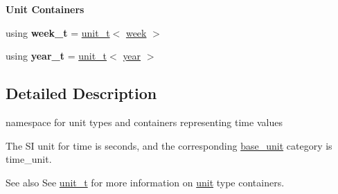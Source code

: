 \begin{Indent}{\bf Unit Containers}
\begin{DoxyCompactItemize}
\item 
\hypertarget{namespaceunits_1_1time_acae409f996805c6735385fbfaad53071}{}using {\bfseries week\+\_\+t} = \hyperlink{classunits_1_1unit__t}{unit\+\_\+t}$<$ \hyperlink{structunits_1_1unit}{week} $>$\label{namespaceunits_1_1time_acae409f996805c6735385fbfaad53071}

\item 
\hypertarget{namespaceunits_1_1time_a6dafd3656d8ce0ebdd388f6333fc47a0}{}using {\bfseries year\+\_\+t} = \hyperlink{classunits_1_1unit__t}{unit\+\_\+t}$<$ \hyperlink{structunits_1_1unit}{year} $>$\label{namespaceunits_1_1time_a6dafd3656d8ce0ebdd388f6333fc47a0}

\end{DoxyCompactItemize}
\end{Indent}


\subsection{Detailed Description}
namespace for unit types and containers representing time values 

The S\+I unit for time is {\ttfamily seconds}, and the corresponding {\ttfamily \hyperlink{structunits_1_1base__unit}{base\+\_\+unit}} category is {\ttfamily time\+\_\+unit}. \begin{DoxySeeAlso}{See also}
See \hyperlink{classunits_1_1unit__t}{unit\+\_\+t} for more information on \hyperlink{structunits_1_1unit}{unit} type containers. 
\end{DoxySeeAlso}
